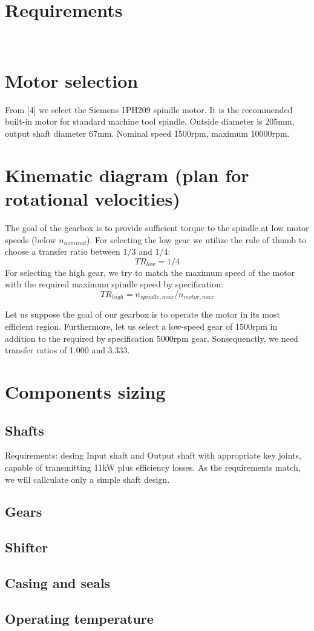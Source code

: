 \documentclass{article}
\begin{document}
\section{Requirements}
 \\


\section{Motor selection}
From [4] we select the Siemens 1PH209 spindle motor.
It is the recommended built-in motor for standard machine tool spindle.
Outside diameter is 205mm, output shaft diameter 67mm.
Nominal speed 1500rpm, maximum 10000rpm.

\section{Kinematic diagram (plan for rotational velocities)}
The goal of the gearbox is to provide sufficient torque to the spindle at low motor speeds (below $n_{nominal}$).
For selecting the low gear we utilize the rule of thumb to choose a transfer ratio between $1/3$ and $1/4$:
$$ TR_{low} = 1/4 $$
For selecting the high gear, we try to match the maximum speed of the motor with the required maximum spindle speed by specification:
$$ TR_{high} = n_{spindle, max} / n_{motor, max} $$

Let us suppose the goal of our gearbox is to operate the motor in its most efficient region.
Furthermore, let us select a low-speed gear of 1500rpm in addition to the required by specification 5000rpm gear.
Sonsequenctly, we need transfer ratios of 1.000 and 3.333.

\section{Components sizing}
\subsection{Shafts}
Requirements: desing Input shaft and Output shaft with appropriate key joints, capable of transmitting 11kW plus efficiency losses.
As the requirements match, we will callculate only a simple shaft design.


\FPeval{}
\vExample

\subsection{Gears}
\subsection{Shifter}
\subsection{Casing and seals}
\subsection{Operating temperature}
\end{document}
